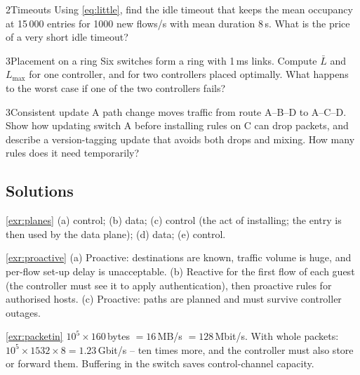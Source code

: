 \documentclass[11pt,a4paper]{article}
\begin{document}
\begin{exercisebox}{2}{Timeouts}\label{exr:little}
Using \cref{eq:little}, find the idle timeout that keeps the mean occupancy at 15\,000 entries for 1000 new
flows/s with mean duration 8\,s. What is the price of a very short idle timeout?
\end{exercisebox}

\begin{exercisebox}{3}{Placement on a ring}\label{exr:place}
Six switches form a ring with 1\,ms links. Compute $\bar L$ and $L_{\max}$ for one controller, and for two
controllers placed optimally. What happens to the worst case if one of the two controllers fails?
\end{exercisebox}

\begin{exercisebox}{3}{Consistent update}\label{exr:consistent}
A path change moves traffic from route A--B--D to A--C--D. Show how updating switch A before installing rules on C
can drop packets, and describe a version-tagging update that avoids both drops and mixing. How many rules does it
need temporarily?
\end{exercisebox}

\subsection*{Solutions}

\begin{solutionbox}{\ref{exr:planes}}
(a) control; (b) data; (c) control (the act of installing; the entry is then used by the data plane); (d) data;
(e) control.
\end{solutionbox}

\begin{solutionbox}{\ref{exr:proactive}}
(a) Proactive: destinations are known, traffic volume is huge, and per-flow set-up delay is unacceptable.
(b) Reactive for the first flow of each guest (the controller must see it to apply authentication), then
proactive rules for authorised hosts. (c) Proactive: paths are planned and must survive controller outages.
\end{solutionbox}

\begin{solutionbox}{\ref{exr:packetin}}
$10^5\times160$\,bytes $= 16$\,MB/s $= 128$\,Mbit/s. With whole packets: $10^5\times1532\times8 = 1.23$\,Gbit/s -- ten times
more, and the controller must also store or forward them. Buffering in the switch saves control-channel capacity.
\end{solutionbox}
\end{document}
